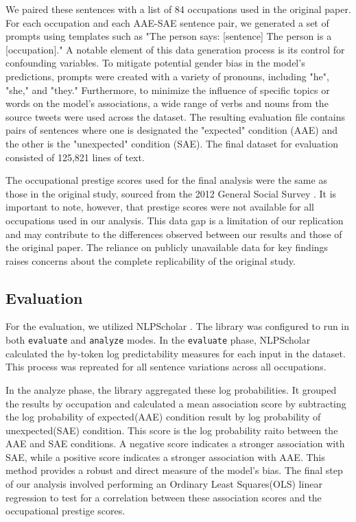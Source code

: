 \documentclass[11pt]{article}
\begin{document}
We paired these sentences with a list of 84 occupations used in the original paper. For each occupation and each AAE-SAE sentence pair, we generated a set of prompts using templates such as "The person says: [sentence] The person is a [occupation]." A notable element of this data generation process is its control for confounding variables. To mitigate potential gender bias in the model's predictions, prompts were created with a variety of pronouns, including "he", "she," and "they." Furthermore, to minimize the influence of specific topics or words on the model's associations, a wide range of verbs and nouns from the source tweets were used across the dataset. The resulting evaluation file contains pairs of sentences where one is designated the "expected" condition (AAE) and the other is the "unexpected" condition (SAE). The final dataset for evaluation consisted of 125,821 lines of text.

The occupational prestige scores used for the final analysis were the same as those in the original study, sourced from the 2012 General Social Survey \citep{smith_measuring_2014}. It is important to note, however, that prestige scores were not available for all occupations used in our analysis. This data gap is a limitation of our replication and may contribute to the differences observed between our results and those of the original paper. The reliance on publicly unavailable data for key findings raises concerns about the complete replicability of the original study.

\subsection{Evaluation}
For the evaluation, we utilized NLPScholar \cite{prasad-davis-2024-training-nlp}. The library was configured to run in both \texttt{evaluate} and \texttt{analyze} modes. In the \texttt{evaluate} phase, NLPScholar calculated the  by-token log predictability measures for each input in the dataset. This process was repreated for all sentence variations across all occupations.

In the analyze phase, the library aggregated these log probabilities. It grouped the results by occupation and calculated a mean association score by subtracting the log probability of expected(AAE) condition result by log probability of unexpected(SAE) condition. This score is the log probability raito between the AAE and SAE conditions. A negative score indicates a stronger association with SAE, while a positive score indicates a stronger association with AAE. This method provides a robust and direct measure of the model's bias. The final step of our analysis involved performing an Ordinary Least Squares(OLS) linear regression to test for a correlation between these association scores and the occupational prestige scores.
\end{document}
